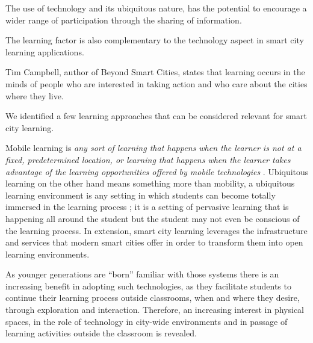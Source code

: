 
The use of technology and its ubiquitous nature, has the potential to encourage a wider range of participation through the sharing of information\cite{fredericks_augmenting_2013}.

The learning factor is also complementary to the technology aspect in smart city learning applications.

Tim Campbell, author of Beyond Smart Cities\cite{campbell_smart_2013}, states that learning occurs in the minds of people who are interested in taking action and who care about the cities where they live.

We identified a few learning approaches that can be considered relevant for smart city learning.

Mobile learning is \textit{any sort of learning that happens when the learner is not at a fixed, predetermined location, or learning that happens when the learner takes advantage of the learning opportunities offered by mobile technologies} \cite{omalley_guidelines_2005}. Ubiquitous learning on the other hand means something more than mobility, a ubiquitous learning environment is any setting in which students can become totally immersed in the learning process \cite{syvanen_supporting_2005}; it is a setting of pervasive learning that is happening all around the student but the student may not even be conscious of the learning process. In extension, smart city learning leverages the infrastructure and services that modern smart cities offer in order to transform them into open learning environments\cite{christopoulou_learning_2013}.

As younger generations are ``born'' familiar with those systems there is an increasing benefit in adopting such technologies, as they facilitate students to continue their learning process outside classrooms, when and where they desire, through exploration and interaction. Therefore, an increasing interest in physical spaces, in the role of technology in city-wide environments and in passage of learning activities outside the classroom is revealed\cite{christopoulou_learning_2013}.

